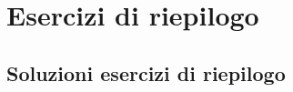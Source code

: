 %	
\chapter{Esercizi di riepilogo}
\tcbstartrecording







\tcbstoprecording
\newpage
\section{Soluzioni esercizi di riepilogo}
\tcbinputrecords							